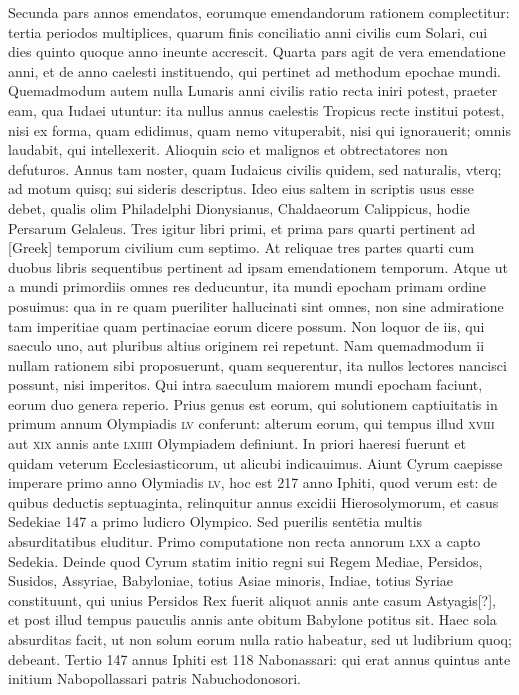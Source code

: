 \begin{parnumbers}
{}
Secunda pars annos emendatos, eorumque emendandorum
rationem complectitur: tertia periodos multiplices, quarum finis
conciliatio anni civilis cum Solari, cui dies quinto quoque anno
ineunte accrescit.
\lnr{}Quarta pars agit de vera emendatione anni, et
de anno caelesti instituendo, qui pertinet ad methodum epochae
mundi.
\lnr{}Quemadmodum autem nulla Lunaris anni civilis ratio
recta iniri potest, praeter eam, qua Iudaei utuntur: ita nullus annus
caelestis Tropicus recte institui potest, nisi ex forma, quam edidimus,
quam nemo vituperabit, nisi qui ignorauerit; omnis laudabit,
qui intellexerit.
\lnr{}Alioquin scio et malignos et obtrectatores non defuturos. 
\lnr{}Annus tam noster, quam Iudaicus civilis quidem, sed naturalis,
vterq; ad motum quisq; sui sideris descriptus. 
\lnr{}Ideo eius saltem
in scriptis usus esse debet, qualis olim Philadelphi Dionysianus,
Chaldaeorum Calippicus, hodie Persarum Gelaleus. 
\lnr{}Tres igitur libri
primi, et prima pars quarti pertinent ad \textgreek{[Greek]} temporum civilium
cum septimo.
\lnr{}At reliquae tres partes quarti cum duobus libris
sequentibus pertinent ad ipsam emendationem temporum.
\lnr{}Atque
ut a mundi primordiis omnes res deducuntur, ita mundi epocham
primam ordine posuimus: qua in re quam pueriliter hallucinati sint
omnes, non sine admiratione tam imperitiae quam pertinaciae eorum
dicere possum.
\lnr{}Non loquor de iis, qui saeculo uno, aut pluribus altius
originem rei repetunt.
\lnr{}Nam quemadmodum ii nullam rationem
sibi proposuerunt, quam sequerentur, ita nullos lectores nancisci
possunt, nisi imperitos. 
\lnr{}Qui intra saeculum maiorem mundi
epocham faciunt, eorum duo genera reperio.
\lnr{}Prius genus est eorum,
qui solutionem captiuitatis in primum annum Olympiadis \textsc{lv} conferunt:
alterum eorum, qui tempus illud \textsc{xviii} aut \textsc{xix} annis ante
\textsc{lxiiii} Olympiadem definiunt.
\lnr{}In priori haeresi fuerunt et
quidam veterum Ecclesiasticorum, ut alicubi indicauimus. 
\lnr{}Aiunt
Cyrum caepisse imperare primo anno Olymiadis \textsc{lv}, hoc est 217
anno Iphiti, quod verum est: de quibus deductis septuaginta, relinquitur
annus excidii Hierosolymorum, et casus Sedekiae 147 a primo ludicro
Olympico.
\lnr{}Sed puerilis sentētia multis absurditatibus eluditur.
\lnr{}Primo computatione non recta annorum \textsc{lxx} a capto Sedekia.
\lnr{}Deinde quod Cyrum statim initio regni sui Regem Mediae, Persidos,
Susidos, Assyriae, Babyloniae, totius Asiae minoris, Indiae, totius
Syriae constituunt, qui unius Persidos Rex fuerit aliquot annis ante
casum Astyagis[?], et post illud tempus pauculis annis ante obitum
Babylone potitus sit.
\lnr{}Haec sola absurditas facit, ut non solum eorum
nulla ratio habeatur, sed ut ludibrium quoq; debeant.
\lnr{}Tertio 147 annus
Iphiti est 118 Nabonassari: qui erat annus quintus ante initium Nabopollassari
patris Nabuchodonosori.


\end{parnumbers}
